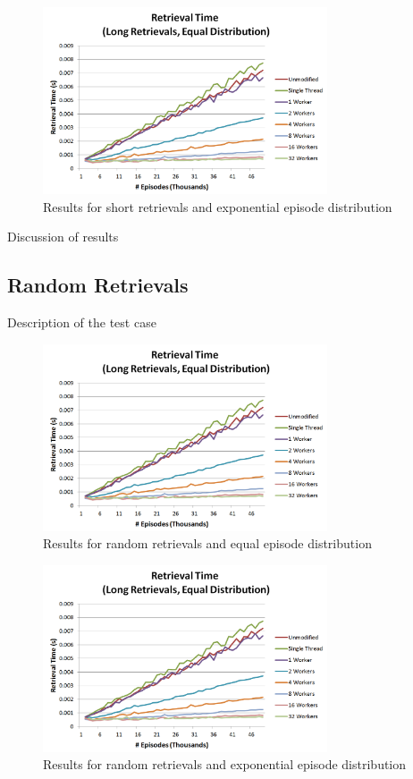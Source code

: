 \documentclass[11pt]{article} %
\begin{document}
\begin{figure}[h]
\caption{Results for short retrievals and exponential episode distribution}
\centering
\includegraphics[width=0.75\textwidth]{images/ret_worst_eq}
\end{figure}

Discussion of results

\subsection{Random Retrievals}
Description of the test case
\begin{figure}[h]
\caption{Results for random retrievals and equal episode distribution}
\centering
\includegraphics[width=0.75\textwidth]{images/ret_worst_eq}
\end{figure}

\begin{figure}[h]
\caption{Results for random retrievals and exponential episode distribution}
\centering
\includegraphics[width=0.75\textwidth]{images/ret_worst_eq}
\end{figure}
\end{document}
